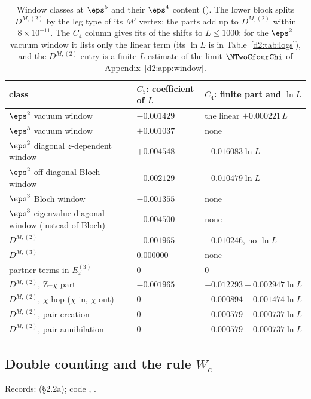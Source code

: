 \begin{table}[ht]
\centering\footnotesize\renewcommand{\arraystretch}{1.15}
\begin{tabular}{@{}p{7.4cm}p{3.2cm}p{4.4cm}@{}}
\toprule
class & $C_5$: coefficient of $L$ & $C_4$: finite part and $\ln L$ \\\midrule
$\eps^2$ vacuum window & $-0.001429$ & the linear $+0.000221\,L$ \\
$\eps^3$ vacuum window & $+0.001037$ & none \\
$\eps^2$ diagonal $z$-dependent window & $+0.004548$ & $+0.016083\ln L$ \\
$\eps^2$ off-diagonal Bloch window & $-0.002129$ & $+0.010479\ln L$ \\
$\eps^3$ Bloch window & $-0.001355$ & none \\
$\eps^3$ eigenvalue-diagonal window (instead of Bloch) & $-0.004500$ & none \\
$D^{M,(2)}$ & $-0.001965$ & $+0.010246$, no $\ln L$ \\
$D^{M,(3)}$ & $0.000000$ & none \\
partner terms in $E_z^{(3)}$ & 0 & 0 \\\midrule
$D^{M,(2)}$, Z--$\chi$ part & $-0.001965$ & $+0.012293-0.002947\ln L$ \\
$D^{M,(2)}$, $\chi$ hop ($\chi$ in, $\chi$ out) & 0 & $-0.000894+0.001474\ln L$ \\
$D^{M,(2)}$, pair creation & 0 & $-0.000579+0.000737\ln L$ \\
$D^{M,(2)}$, pair annihilation & 0 & $-0.000579+0.000737\ln L$ \\
\bottomrule
\end{tabular}
\caption{Window classes at $\eps^5$ and their $\eps^4$ content (). The lower
block splits $D^{M,(2)}$ by the leg type of its $M'$ vertex; the parts add up to $D^{M,(2)}$ within $8\times10^{-11}$. The $C_4$
column gives fits of the shifts to $L\le1000$: for the $\eps^2$ vacuum window it lists only the linear term (its $\ln L$ is in
Table~\ref{d2:tab:logs}), and the $D^{M,(2)}$ entry is a finite-$L$ estimate of the limit $\NTwoCfourChi$ of
Appendix~\ref{d2:app:window}.}
\label{d2:tab:c5classes}
\end{table}

\subsection{Double counting and the rule \texorpdfstring{$W_c$}{Wc}}\label{d2:app:Wc}
{\small\raggedright\noindent Records:  (\S2.2a); code ,
.\par}

